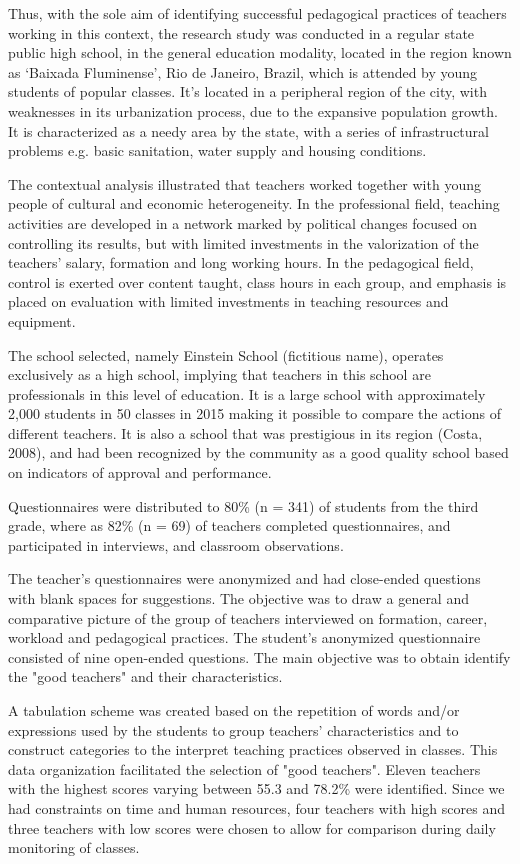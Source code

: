\documentclass[11pt, a4paper]{article}
\begin{document}
Thus, with the sole aim of identifying successful pedagogical practices of teachers working in this context, the research study
was conducted in a regular state public high school, in the general education modality, located in the region known as `Baixada
Fluminense', Rio de Janeiro, Brazil, which is attended by young students of popular classes. It's located in a peripheral region of
the city, with weaknesses in its urbanization process, due to the expansive population growth. It is characterized as a needy area
by the state, with a series of infrastructural problems e.g. basic sanitation, water supply and housing conditions.

The contextual analysis illustrated that teachers worked together with young people of cultural and economic
heterogeneity. In the professional field, teaching activities are developed in a network marked by political changes
focused on controlling its results, but with limited investments in the valorization of the teachers' salary, formation and
long working hours. In the pedagogical field, control is exerted over content taught, class hours in each group, and
emphasis is placed on evaluation with limited investments in teaching resources and equipment.

The school selected, namely Einstein School (fictitious name), operates exclusively as a high school, implying that
teachers in this school are professionals in this level of education. It is a large school with approximately 2,000 students in
50 classes in 2015 making it possible to compare the actions of different teachers. It is also a school that was prestigious in
its region (Costa, 2008), and had been recognized by the community as a good quality school based on indicators of
approval and performance.

Questionnaires were distributed to 80\% (n = 341) of students from the third grade, where as 82\% (n = 69) of teachers
completed questionnaires, and participated in interviews, and classroom observations.

The teacher's questionnaires were anonymized and had close-ended questions with blank spaces for suggestions. The
objective was to draw a general and comparative picture of the group of teachers interviewed on formation, career,
workload and pedagogical practices. The student's anonymized questionnaire consisted of nine open-ended questions.
The main objective was to obtain identify the "good teachers" and their characteristics.

A tabulation scheme was created based on the repetition of words and/or expressions used by the students to group
teachers' characteristics and to construct categories to the interpret teaching practices observed in classes. This data
organization facilitated the selection of "good teachers". Eleven teachers with the highest scores varying between 55.3%
and 78.2\% were identified. Since we had constraints on time and human resources, four teachers with high scores and
three teachers with low scores were chosen to allow for comparison during daily monitoring of classes.
\end{document}
